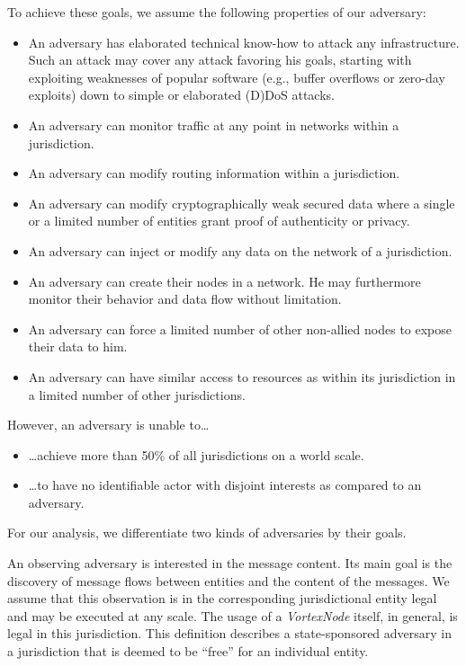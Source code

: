 \documentclass[acmsmall, screen, final, natbib=false]{acmart}
\begin{document}
	To achieve these goals, we assume the following properties of our adversary:
	\begin{itemize}
		\item An adversary has elaborated technical know-how to attack any infrastructure. Such an attack may cover any attack favoring his goals, starting with exploiting weaknesses of popular software (e.g., buffer overflows or zero-day exploits) down to simple or elaborated (D)DoS attacks.
		\item An adversary can monitor traffic at any point in networks within a jurisdiction.
		\item An adversary can modify routing information within a jurisdiction.
		\item An adversary can modify cryptographically weak secured data where a single or a limited number of entities grant proof of authenticity or privacy.
		\item An adversary can inject or modify any data on the network of a jurisdiction.
		\item An adversary can create their nodes in a network. He may furthermore monitor their behavior and data flow without limitation.
		\item An adversary can force a limited number of other non-allied nodes to expose their data to him. 
		\item An adversary can have similar access to resources as within its jurisdiction in a limited number of other jurisdictions.
	\end{itemize}
	
	However, an adversary is unable to\ldots\begin{itemize}
		\item \ldots{}achieve more than 50\% of all jurisdictions on a world scale. 
		\item \ldots{}to have no identifiable actor with disjoint interests as compared to an adversary.
	\end{itemize}
	
	For our analysis, we differentiate two kinds of adversaries by their goals.
	
	An observing adversary is interested in the message content. Its main goal is the discovery of message flows between entities and the content of the messages. We assume that this observation is in the corresponding jurisdictional entity legal and may be executed at any scale. The usage of a \emph{VortexNode} itself, in general, is legal in this jurisdiction. This definition describes a state-sponsored adversary in a jurisdiction that is deemed to be ``free'' for an individual entity.
	
\end{document}
